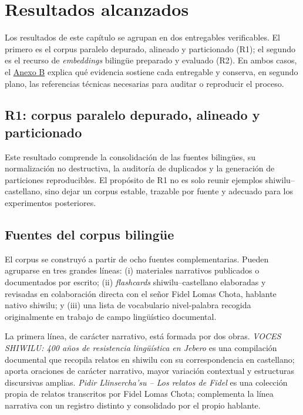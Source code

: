 \documentclass[12pt,a4paper,oneside]{book}
\begin{document}
\section{Resultados alcanzados}\label{corpus-resultados}

Los resultados de este capítulo se agrupan en dos entregables verificables. El primero es el corpus paralelo depurado, alineado y particionado (R1); el segundo es el recurso de \emph{embeddings} bilingüe preparado y evaluado (R2). En ambos casos, el \hyperref[anexo-documento-reproducible]{Anexo B} explica qué evidencia sostiene cada entregable y conserva, en segundo plano, las referencias técnicas necesarias para auditar o reproducir el proceso.

\subsection{R1: corpus paralelo depurado, alineado y particionado}\label{r1-corpus-paralelo}

Este resultado comprende la consolidación de las fuentes bilingües, su normalización no destructiva, la auditoría de duplicados y la generación de particiones reproducibles. El propósito de R1 no es solo reunir ejemplos shiwilu--castellano, sino dejar un corpus estable, trazable por fuente y adecuado para los experimentos posteriores.

\subsection{Fuentes del corpus bilingüe}\label{fuentes-del-corpus-bilingue}

El corpus se construyó a partir de ocho fuentes complementarias. Pueden agruparse en tres grandes líneas: (i) materiales narrativos publicados o documentados por escrito; (ii) \emph{flashcards} shiwilu--castellano elaboradas y revisadas en colaboración directa con el señor Fidel Lomas Chota, hablante nativo shiwilu; y (iii) una lista de vocabulario nivel-palabra recogida originalmente en trabajo de campo lingüístico documental.

La primera línea, de carácter narrativo, está formada por dos obras. \emph{VOCES SHIWILU: 400 años de resistencia lingüística en Jebero} es una compilación documental que recopila relatos en shiwilu con su correspondencia en castellano; aporta oraciones de carácter narrativo, mayor variación contextual y estructuras discursivas amplias. \emph{Pidir Llinsercha'su -- Los relatos de Fidel} es una colección propia de relatos transcritos por Fidel Lomas Chota; complementa la línea narrativa con un registro distinto y consolidado por el propio hablante.
\end{document}
